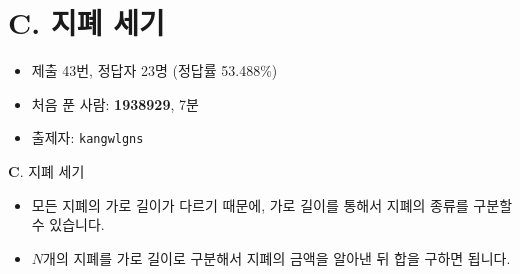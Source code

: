 \section{C. 지폐 세기}

\begin{frame} %
    \begin{itemize}
        \item 제출 43번, 정답자 23명 (정답률 53.488\%)
        \item 처음 푼 사람: \textbf{1938929}, 7분
        \item 출제자: \texttt{kangwlgns}
    \end{itemize}
\end{frame}

\begin{frame}{\textbf{C}. 지폐 세기}
    \begin{itemize}
        \item 모든 지폐의 가로 길이가 다르기 때문에, 가로 길이를 통해서 지폐의 종류를 구분할 수 있습니다.
        \item $N$개의 지폐를 가로 길이로 구분해서 지폐의 금액을 알아낸 뒤 합을 구하면 됩니다.
    \end{itemize}
\end{frame}
